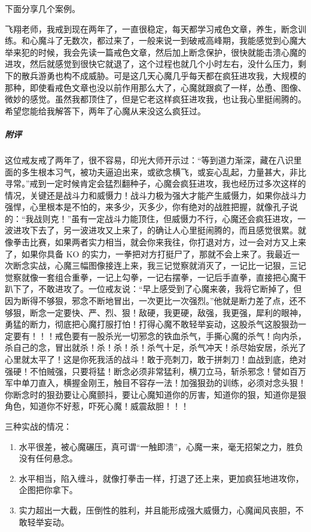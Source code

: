 下面分享几个案例。

\begin{case}
    飞翔老师，我戒到现在两年了，一直很稳定，每天都学习戒色文章，养生，断念训练。和心魔斗了无数次，都过来了，一般来说一到破戒高峰期，我能感觉到心魔大举来犯的时候，我会先读一篇戒色文章，然后加上断念保护，很快就能击溃心魔的进攻，然后就感觉到很快它就退了，这个过程也就几个小时左右，没什么压力，剩下的散兵游勇也构不成威胁。可是这几天心魔几乎每天都在疯狂进攻我，大规模的那种，即使看戒色文章也没以前作用那么大了，心魔就跟疯了一样，怂恿、图像、微妙的感觉。虽然我都顶住了，但是它老这样疯狂进攻我，也让我心里挺闹腾的。希望您能给我解答下，两年了心魔从来没这么疯狂过。
    \subparagraph{附评} 这位戒友戒了两年了，很不容易，印光大师开示过：“等到道力渐深，藏在八识里面的多生根本习气，被功夫逼迫出来，或欲念横飞，或妄心乱起，力量甚大，非比寻常。”戒到一定时候肯定会猛烈翻种子，心魔会疯狂进攻，我也经历过多次这样的情况，关键还是战斗力和威慑力！战斗力极为强大才能产生威慑力，如果你战斗力强悍，心里根本是不怕的，来多少，灭多少，你有绝对的战胜把握，就像孔子说的：“我战则克！”虽有一定战斗力能顶住，但威慑力不行，心魔还会疯狂进攻，一波进攻下去了，另一波进攻又上来了，的确让人心里挺闹腾的，而且感觉很累。就像拳击比赛，如果两者实力相当，就会你来我往，你打退对方，过一会对方又上来了，如果你具备 KO 的实力，一拳把对方打挺尸了，那就不会上来了。我最近一次断念实战，心魔三幅图像接连上来，我三记觉察就消灭了，一记比一记狠，三记觉察就像一套组合重拳，一记上勾拳，一记右摆拳，一记后手直拳，直接把心魔干趴下了，不敢进攻了。一位戒友说：“早上感受到了心魔来袭，我将它断掉了，但因为断得不够狠，邪念不断地冒出，一次更比一次强烈。”他就是断力差了点，还不够狠，断念一定要快、严、烈、狠！敌硬，我更硬，敌强，我更强，犀利的眼神，勇猛的断力，彻底把心魔打服打怕！打得心魔不敢轻举妄动，这股杀气这股狠劲一定要有！！！戒色要有一股杀光一切邪念的铁血杀气，手撕心魔的杀气！向内杀，杀自己的念，冒出就杀！杀！杀！杀！杀气十足，杀气冲天！杀尽始安居，杀光了心里就太平了！这是你死我活的战斗！敢于亮刺刀，敢于拼刺刀！血战到底，绝对强硬！不怕贼强，只要将猛！断念必须非常猛利，横刀立马，斩杀邪念！譬如百万军中单刀直入，横握金刚王，触目不容存一法！加强狠劲的训练，必须对念头狠！你断念时的狠劲要让心魔颤抖，要让心魔知道你的厉害，知道你的狠，知道你是狠角色，知道你不好惹，吓死心魔！威震敌胆！！！

    三种实战的情况：

    \begin{enumerate}
        \item 水平很差，被心魔碾压，真可谓“一触即溃”，心魔一来，毫无招架之力，胜负没有任何悬念。
        \item 水平相当，陷入缠斗，就像打拳击一样，打退了还上来，更加疯狂地进攻你，企图把你拿下。
        \item 实力超出一大截，压倒性的胜利，并且能形成强大威慑力，心魔闻风丧胆，不敢轻举妄动。
    \end{enumerate}


\end{case}
